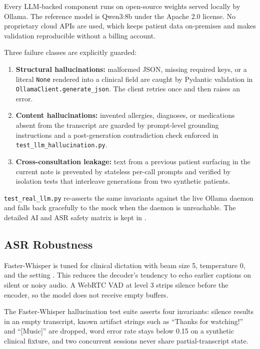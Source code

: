 Every LLM-backed component runs on open-source weights served locally by Ollama. The reference model is Qwen3:8b under the Apache 2.0 license. No proprietary cloud APIs are used, which keeps patient data on-premises and makes validation reproducible without a billing account.

Three failure classes are explicitly guarded:

\begin{enumerate}
  \item \textbf{Structural hallucinations:} malformed JSON, missing required keys, or a literal \texttt{None} rendered into a clinical field are caught by Pydantic validation in \texttt{OllamaClient.generate\_json}. The client retries once and then raises an error.
  \item \textbf{Content hallucinations:} invented allergies, diagnoses, or medications absent from the transcript are guarded by prompt-level grounding instructions and a post-generation contradiction check enforced in \texttt{test\_llm\_hallucination.py}.
  \item \textbf{Cross-consultation leakage:} text from a previous patient surfacing in the current note is prevented by stateless per-call prompts and verified by isolation tests that interleave generations from two synthetic patients.
\end{enumerate}

\texttt{test\_real\_llm.py} re-asserts the same invariants against the live Ollama daemon and falls back gracefully to the mock when the daemon is unreachable. The detailed AI and ASR safety matrix is kept in .

\subsection{ASR Robustness}
\label{subsec:asr-robustness}

Faster-Whisper is tuned for clinical dictation with beam size 5, temperature 0, and the setting . This reduces the decoder's tendency to echo earlier captions on silent or noisy audio. A WebRTC VAD at level 3 strips silence before the encoder, so the model does not receive empty buffers.

The Faster-Whisper hallucination test suite asserts four invariants: silence results in an empty transcript, known artifact strings such as ``Thanks for watching!'' and ``[Music]'' are dropped, word error rate stays below 0.15 on a synthetic clinical fixture, and two concurrent sessions never share partial-transcript state.

